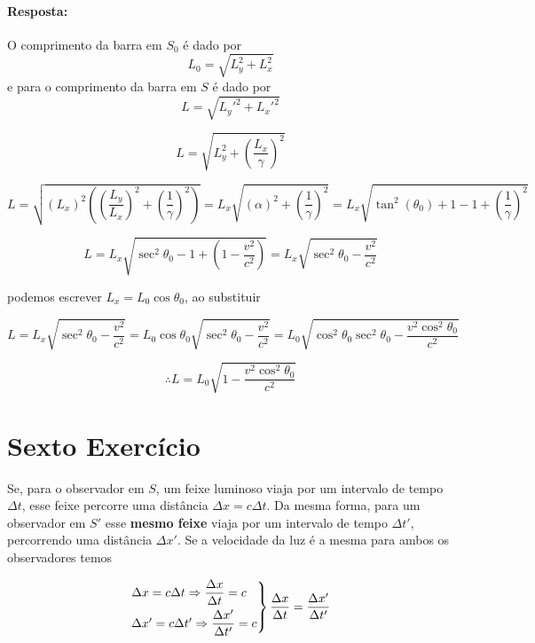 \documentclass[10pt,a4paper]{article}
\begin{document}
\begin{enumerate}
		 \paragraph{Resposta:}
		 O comprimento da barra em $ S_0 $ é dado por
		 $$ L_0 = \sqrt{L_y^2+L_x^2}$$
		 e para o comprimento da barra em $ S $ é dado por
		 $$ L= \sqrt{L_y'^2+L_x'^2}$$
		 
		 $$ L= \sqrt{L_y^2+\left(\dfrac{L_x}{\gamma}\right)^2}$$
		 
		 $$ L= \sqrt{(L_x)^2\left(\left(\dfrac{L_y}{L_x}\right)^2+\left(\dfrac{1}{\gamma}\right)^2\right)} = L_x \sqrt{(\alpha)^2+\left(\dfrac{1}{\gamma}\right)^2} = L_x \sqrt{\tan^2 (\theta_0)+ 1 - 1 + \left(\dfrac{1}{\gamma}\right)^2} $$
		 
		 $$ L= L_x \sqrt{\sec^2 \theta_0 - 1 + \left(1 - \frac{v^2}{c^2}\right)} = L_x \sqrt{\sec^2 \theta_0 - \frac{v^2}{c^2}}$$
		 
		 podemos escrever $ L_x = L_0 \cos\theta_0$, ao substituir
		 
		 $$L=  L_x  \sqrt{\sec^2 \theta_0 - \frac{v^2}{c^2}} = L_0 \cos\theta_0\sqrt{\sec^2 \theta_0 - \frac{v^2}{c^2}} = L_0 \sqrt{\cos^2\theta_0\sec^2 \theta_0 - \frac{v^2\cos^2\theta_0}{c^2}}  $$
		 
		 $$\therefore L= L_0 \sqrt{1 - \frac{v^2\cos^2\theta_0}{c^2}}$$
	\end{enumerate}
	
	
	\section{Sexto Exercício}
	Se, para o observador em $S$, um feixe luminoso viaja por um intervalo de
	tempo $\Delta t$, esse feixe percorre uma distância $\Delta x = c\Delta t$. Da mesma forma,
	para um observador em $S'$ esse \textbf{mesmo feixe} viaja por um intervalo de
	tempo $\Delta t'$, percorrendo uma distância $\Delta x'$. Se a velocidade da luz é a mesma para ambos os observadores temos 
	
	\begin{equation*}
		\begin{rcases}
			\Delta x = c\Delta t \Rightarrow \dfrac{\Delta x}{\Delta t} = c \\
			\Delta x' = c\Delta t' \Rightarrow \dfrac{\Delta x'}{\Delta t'} = c
		\end{rcases} 
		\frac{\Delta x}{\Delta t} = \frac{\Delta x'}{\Delta t'}
	\end{equation*}
	
\end{document}
